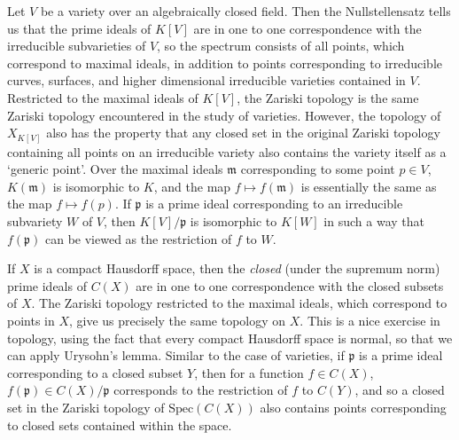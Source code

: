 \begin{example}
    Let $V$ be a variety over an algebraically closed field. Then the Nullstellensatz tells us that the prime ideals of $K[V]$ are in one to one correspondence with the irreducible subvarieties of $V$, so the spectrum consists of all points, which correspond to maximal ideals, in addition to points corresponding to irreducible curves, surfaces, and higher dimensional irreducible varieties contained in $V$. Restricted to the maximal ideals of $K[V]$, the Zariski topology is the same Zariski topology encountered in the study of varieties. However, the topology of $X_{K[V]}$ also has the property that any closed set in the original Zariski topology containing all points on an irreducible variety also contains the variety itself as a `generic point'. Over the maximal ideals $\mathfrak{m}$ corresponding to some point $p \in V$, $K(\mathfrak{m})$ is isomorphic to $K$, and the map $f \mapsto f(\mathfrak{m})$ is essentially the same as the map $f \mapsto f(p)$. If $\mathfrak{p}$ is a prime ideal corresponding to an irreducible subvariety $W$ of $V$, then $K[V]/\mathfrak{p}$ is isomorphic to $K[W]$ in such a way that $f(\mathfrak{p})$ can be viewed as the restriction of $f$ to $W$.
\end{example}

\begin{example}
    If $X$ is a compact Hausdorff space, then the {\it closed} (under the supremum norm) prime ideals of $C(X)$ are in one to one correspondence with the closed subsets of $X$. The Zariski topology restricted to the maximal ideals, which correspond to points in $X$, give us precisely the same topology on $X$. This is a nice exercise in topology, using the fact that every compact Hausdorff space is normal, so that we can apply Urysohn's lemma. Similar to the case of varieties, if $\mathfrak{p}$ is a prime ideal corresponding to a closed subset $Y$, then for a function $f \in C(X)$, $f(\mathfrak{p}) \in C(X)/\mathfrak{p}$ corresponds to the restriction of $f$ to $C(Y)$, and so a closed set in the Zariski topology of $\text{Spec}(C(X))$ also contains points corresponding to closed sets contained within the space.
\end{example}

